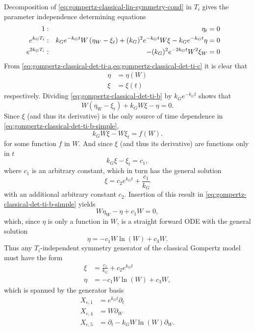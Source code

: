 Decomposition of \cref{eq:gompertz-classical-lin-symmetry-cond} in \(T_i\) gives the parameter independence determining equations
\begin{subequations}
  \begin{flalign}
    1 & : & \eta_t &= 0 && \FlLabel{eq:gompertz-classical-det-ti-a}\\
    e^{k_G T_i} & : & k_G e^{-k_G t} W \left(\eta_W - \xi_t\right) + (k_G)^2 e^{-k_G t} W \xi - k_G e^{-k_G t} \eta &= 0 && \FlLabel{eq:gompertz-classical-det-ti-b}\\
    e^{2 k_G T_i} & : & -(k_G)^2 e^{-2 k_G t} W^2 \xi_W &= 0 && \FlLabel{eq:gompertz-classical-det-ti-c}
  \end{flalign}
\end{subequations}
From \cref{eq:gompertz-classical-det-ti-a,eq:gompertz-classical-det-ti-c} it is clear that
\begin{align}
  \eta &= \eta(W) \\
  \xi &= \xi(t)
\end{align}
respectively.
Dividing \cref{eq:gompertz-classical-det-ti-b} by \(k_G e^{-k_G t}\) shows that
\begin{equation}\label{eq:gompertz-classical-det-ti-b-simple}
  W \left(\eta_W - \xi_t\right) + k_G W \xi - \eta = 0.
\end{equation}
Since \(\xi\) (and thus its derivative) is the only source of time dependence in \cref{eq:gompertz-classical-det-ti-b-simple},
\begin{equation}
  k_G W \xi - W \xi_t = f(W).
\end{equation}
for some function \(f\) in \(W\).
And since \(\xi\) (and thus its derivative) are functions only in \(t\)
\begin{equation}
  k_G \xi - \xi_t = c_1,
\end{equation}
where \(c_1\) is an arbitrary constant, which in turn has the general solution
\begin{equation}
  \xi = c_2 e^{k_G t} + \frac{c_1}{k_G}
\end{equation}
with an additional arbitrary constant \(c_2\).
Insertion of this result in \cref{eq:gompertz-classical-det-ti-b-simple} yields
\begin{equation}
  W \eta_W - \eta + c_1 W = 0,
\end{equation}
which, since \(\eta\) is only a function in \(W\), is a straight forward ODE with the general solution
\begin{equation}
  \eta = -c_1 W \ln(W) + c_3 W.
\end{equation}
Thus any \(T_i\)-independent symmetry generator of the classical Gompertz model  must have the form
\begin{align}
  \xi &= \frac{c_1}{k_G} + c_2 e^{k_G t} \\
  \eta &= -c_1 W \ln(W) + c_3 W,
\end{align}
which is spanned by the generator basis
\begin{align}
  X_{\text{c},1} &= e^{k_G t} \partial_t \\
  X_{\text{c},4} &= W \partial_W \\
  X_{\text{c},5} &= \partial_t - k_G W \ln(W) \partial_W.
\end{align}

